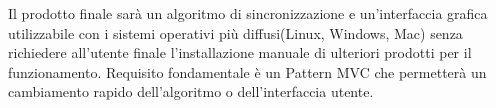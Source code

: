  Il prodotto finale sarà un algoritmo di sincronizzazione e un'interfaccia grafica utilizzabile con i sistemi operativi più diffusi(Linux, Windows, Mac) senza richiedere all'utente finale l'installazione manuale di ulteriori prodotti per il funzionamento. Requisito fondamentale è un Pattern MVC che permetterà un cambiamento rapido dell'algoritmo o dell'interfaccia utente.
